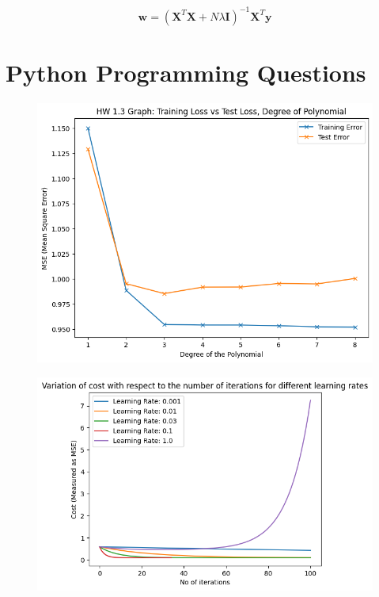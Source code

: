 \documentclass[12pt]{article}
\begin{document}
\begin{enumerate}
\begin{enumerate}
  \[
  \mathbf{w}=\left(\mathbf{X}^T \mathbf{X}+N \lambda \mathbf{I}\right)^{-1} \mathbf{X}^T \mathbf{y}
  \]

  \end{enumerate}
\end{enumerate}

\section{Python Programming Questions}
    \begin{figure}[h]
    \includegraphics{images/hw01_Graph1.3_PolynomialDegreeLoss.png} 
    \end{figure}
    \begin{figure}[h]
    \includegraphics{images/hw01_Graph1.4_Graph_Different_LearningRate.png}
    \end{figure}
\end{document}
